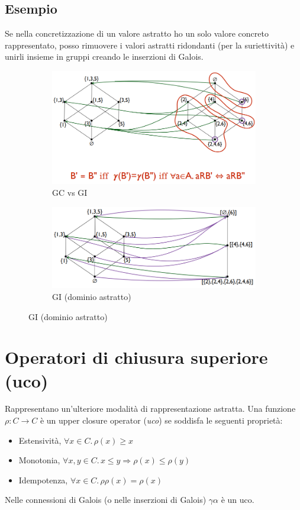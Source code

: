 \documentclass[a4paper,oneside,titlepage]{book}
\begin{document}
\subsection{Esempio}
Se nella concretizzazione di un valore astratto ho un solo valore concreto rappresentato, posso rimuovere i valori astratti ridondanti (per la suriettività) e unirli insieme in gruppi creando le inserzioni di Galois.
\begin{figure}[htp]
	\begin{subfigure}{0.49\textwidth}
	    \centering
		\includegraphics[width=\textwidth, height=\textheight, keepaspectratio]{GCvsGI.png}
		\caption{GC vs GI}
	\end{subfigure}
	\hfill
	\begin{subfigure}{0.49\textwidth}
	    \centering
		\includegraphics[width=\textwidth, height=\textheight, keepaspectratio]{GI.png} 
		\caption{GI (dominio astratto)}
	\end{subfigure}
\end{figure}


\section{Operatori di chiusura superiore (uco)} %
Rappresentano un'ulteriore modalità di rappresentazione astratta. Una funzione $\rho: C \rightarrow C$ è un upper closure operator (\textit{uco}) se soddisfa le seguenti proprietà:
\begin{itemize}
	\item Estensività, $\forall x \in C. \, \rho(x) \geq x$
	\item Monotonia, $\forall x,y \in C. \, x \leq y \Rightarrow \rho(x) \leq \rho(y)$
	\item Idempotenza, $\forall x \in C. \, \rho \rho(x) = \rho(x)$
\end{itemize}
Nelle connessioni di Galois (o nelle inserzioni di Galois) $\gamma \alpha$ è un uco.
\end{document}
